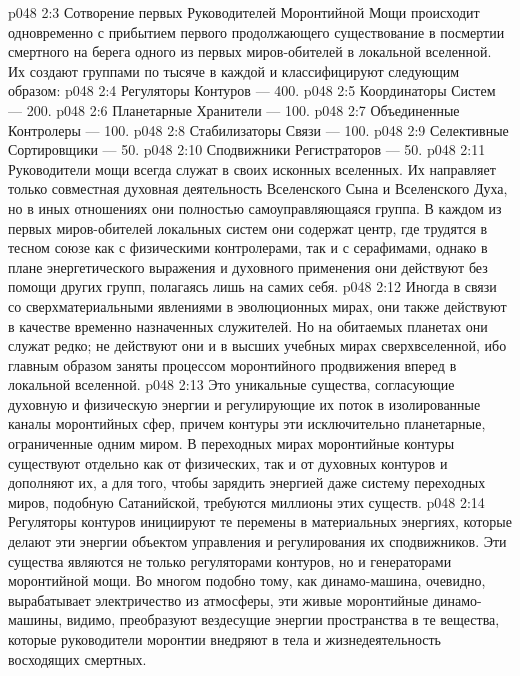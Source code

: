\vs p048 2:3 Сотворение первых Руководителей Моронтийной Мощи происходит одновременно с прибытием первого продолжающего существование в посмертии смертного на берега одного из первых миров\hyp{}обителей в локальной вселенной. Их создают группами по тысяче в каждой и классифицируют следующим образом:
\vs p048 2:4 \bibnobreakspace Регуляторы Контуров --- 400.
\vs p048 2:5 \bibnobreakspace Координаторы Систем --- 200.
\vs p048 2:6 \bibnobreakspace Планетарные Хранители --- 100.
\vs p048 2:7 \bibnobreakspace Объединенные Контролеры --- 100.
\vs p048 2:8 \bibnobreakspace Стабилизаторы Связи --- 100.
\vs p048 2:9 \bibnobreakspace Селективные Сортировщики --- 50.
\vs p048 2:10 \bibnobreakspace Сподвижники Регистраторов --- 50.
\vs p048 2:11 \pc Руководители мощи всегда служат в своих исконных вселенных. Их направляет только совместная духовная деятельность Вселенского Сына и Вселенского Духа, но в иных отношениях они полностью самоуправляющаяся группа. В каждом из первых миров\hyp{}обителей локальных систем они содержат центр, где трудятся в тесном союзе как с физическими контролерами, так и с серафимами, однако в плане энергетического выражения и духовного применения они действуют без помощи других групп, полагаясь лишь на самих себя.
\vs p048 2:12 Иногда в связи со сверхматериальными явлениями в эволюционных мирах, они также действуют в качестве временно назначенных служителей. Но на обитаемых планетах они служат редко; не действуют они и в высших учебных мирах сверхвселенной, ибо главным образом заняты процессом моронтийного продвижения вперед в локальной вселенной.
\vs p048 2:13 \pc {}\bibnobreakspace {} Это уникальные существа, согласующие духовную и физическую энергии и регулирующие их поток в изолированные каналы моронтийных сфер, причем контуры эти исключительно планетарные, ограниченные одним миром. В переходных мирах моронтийные контуры существуют отдельно как от физических, так и от духовных контуров и дополняют их, а для того, чтобы зарядить энергией даже систему переходных миров, подобную Сатанийской, требуются миллионы этих существ.
\vs p048 2:14 Регуляторы контуров инициируют те перемены в материальных энергиях, которые делают эти энергии объектом управления и регулирования их сподвижников. Эти существа являются не только регуляторами контуров, но и генераторами моронтийной мощи. Во многом подобно тому, как динамо\hyp{}машина, очевидно, вырабатывает электричество из атмосферы, эти живые моронтийные динамо\hyp{}машины, видимо, преобразуют вездесущие энергии пространства в те вещества, которые руководители моронтии внедряют в тела и жизнедеятельность восходящих смертных.
